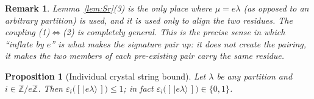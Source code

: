 \documentclass[11pt]{article}
\newtheorem{proposition}[theorem]{Proposition}
\newtheorem{remark}[theorem]{Remark}
\theoremstyle{definition}
\newcommand{\ZZ}{\mathbb{Z}}
\newcommand{\eps}{\varepsilon}
\begin{document}
\begin{remark}
Lemma~\ref{lem:Sr}(3) is the only place where $\mu = e\lambda$ (as opposed to
an arbitrary partition) is used, and it is used only to align the two
residues. The coupling (1)$\Leftrightarrow$(2) is completely general. This is
the precise sense in which ``inflate by $e$'' is what makes the signature
pair up: it does not create the pairing, it makes the two members of each
pre-existing pair carry the same residue.
\end{remark}


\begin{proposition}[Individual crystal string bound]\label{prop:individual}
Let $\lambda$ be any partition and $i \in \ZZ/e\ZZ$. Then
$\eps_i\bigl([\,|e\lambda\rangle\,]\bigr) \le 1$; in fact
$\eps_i\bigl([\,|e\lambda\rangle\,]\bigr) \in \{0, 1\}$.
\end{proposition}
\end{document}
